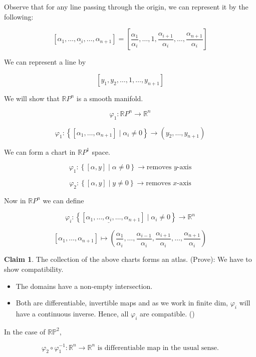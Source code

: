 \documentclass[11pt]{article}
\theoremstyle{definition}
\newtheorem{claim}{Claim}
\theoremstyle{remark}
\begin{document}
Observe that for any line passing through the origin, we can represent it by the following:

\[
[\alpha_1, \dots, \underline{\alpha_i}, \dots, \alpha_{n+1}] = \left[\frac{\alpha_1}{\alpha_i}, \dots, 1, \frac{\alpha_{i+1}}{\alpha_i}, \dots, \frac{\alpha_{n+1}}{\alpha_i}\right]
\]

We can represent a line by

\[
[y_1, y_2, \dots, 1, \dots, y_{n+1}]
\]

We will show that $\mathbb{R}P^n$ is a smooth manifold.

\[
\varphi_1 \colon \mathbb{R}P^n \to \mathbb{R}^n
\]

\[
\varphi_1 \colon \left\{ [\alpha_1, \dots, \alpha_{n+1}] \mid \alpha_i \neq 0 \right\} \to (y_2, \dots, y_{n+1})
\]

We can form a chart in $\mathbb{R}P^1$ space.

\[
\varphi_1 \colon \left\{ [\alpha, y] \mid \alpha \neq 0 \right\} \to \text{removes } y\text{-axis}
\]

\[
\varphi_2 \colon \left\{ [\alpha, y] \mid y \neq 0 \right\} \to \text{removes } x\text{-axis}
\]

Now in $\mathbb{R}P^n$ we can define

\[
\varphi_i \colon \left\{ [\alpha_1, \dots, \underline{\alpha_i}, \dots, \alpha_{n+1}] \mid \alpha_i \neq 0 \right\} \to \mathbb{R}^n
\]

\[
[\alpha_1, \dots, \alpha_{n+1}] \mapsto \left(\frac{\alpha_1}{\alpha_i}, \dots, \frac{\alpha_{i-1}}{\alpha_i}, \frac{\alpha_{i+1}}{\alpha_i}, \dots, \frac{\alpha_{n+1}}{\alpha_i}\right)
\]

\begin{claim}
The collection of the above charts forms an atlas. (Prove): We have to show compatibility.
\end{claim}

\begin{itemize}
    \item The domains have a non-empty intersection.

    \item Both are differentiable, invertible maps and as we work in finite dim, $\varphi_i$ will have a continuous inverse. Hence, all $\varphi_i$ are compatible. (\checkmark)
\end{itemize}

In the case of $\mathbb{RP}^2$,

\[
\varphi_2 \circ \varphi_1^{-1} : \mathbb{R}^n \to \mathbb{R}^n \text{ is differentiable map in the usual sense.}
\]
\end{document}
